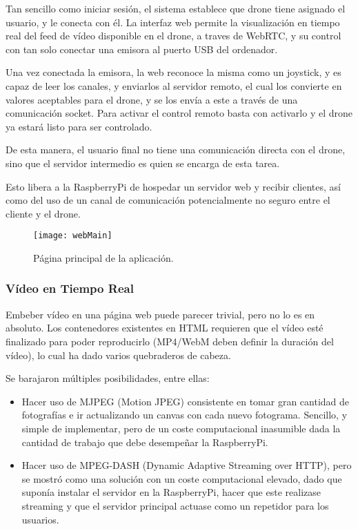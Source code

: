 Tan sencillo como iniciar sesión, el sistema establece que drone tiene asignado el usuario, y le conecta con él. La interfaz web permite la visualización en tiempo real del feed de vídeo disponible en el drone, a traves de WebRTC, y su control con tan solo conectar una emisora al puerto USB del ordenador. 

Una vez conectada la emisora, la web reconoce la misma como un joystick, y es capaz de leer los canales, y enviarlos al servidor remoto, el cual los convierte en valores aceptables para el drone, y se los envía a este a través de una comunicación socket.
Para activar el control remoto basta con activarlo y el drone ya estará listo para ser controlado.

De esta manera, el usuario final no tiene una comunicación directa con el drone, sino que el servidor intermedio es quien se encarga de esta tarea. 

Esto libera a la RaspberryPi de hospedar un servidor web y recibir clientes, así como del uso de un canal de comunicación potencialmente no seguro entre el cliente y el drone. 


\begin{figure}[H]
	\centering
	\texttt{[image: webMain]}
	\caption[Web index]{Página principal de la aplicación.}\label{fig:webmain}
\end{figure}

\subsubsection{Vídeo en Tiempo Real}

Embeber vídeo en una página web puede parecer trivial, pero no lo es en absoluto. Los contenedores existentes en HTML requieren que el vídeo esté finalizado para poder reproducirlo (MP4/WebM deben definir la duración del vídeo), lo cual ha dado varios quebraderos de cabeza. 

Se barajaron múltiples posibilidades, entre ellas:
\begin{itemize}
\item Hacer uso de MJPEG (Motion JPEG) consistente en tomar gran cantidad de fotografías e ir actualizando un canvas con cada nuevo fotograma. Sencillo, y simple de implementar, pero de un coste computacional inasumible dada la cantidad de trabajo que debe desempeñar la RaspberryPi.
\item Hacer uso de MPEG-DASH (Dynamic Adaptive Streaming over HTTP), pero se mostró como una solución con un coste computacional elevado, dado que suponía instalar el servidor en la RaspberryPi, hacer que este realizase streaming y que el servidor principal actuase como un repetidor para los usuarios.  
\end{itemize} 


